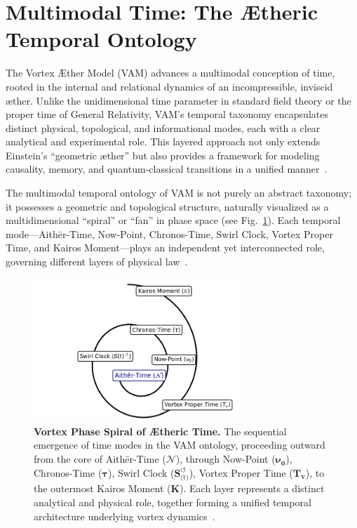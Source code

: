 \documentclass[preprint,notitlepage]{revtex4-2}
\begin{document}
\section{Multimodal Time: The Ætheric Temporal Ontology}

The Vortex Æther Model (VAM) advances a multimodal conception of time, rooted in the internal and relational dynamics of an incompressible, inviscid æther. Unlike the unidimensional time parameter in standard field theory or the proper time of General Relativity, VAM’s temporal taxonomy encapsulates distinct physical, topological, and informational modes, each with a clear analytical and experimental role. This layered approach not only extends Einstein’s “geometric æther” but also provides a framework for modeling causality, memory, and quantum-classical transitions in a unified manner~\cite{VAM-8, VAM-13, VAM-15}.

The multimodal temporal ontology of VAM is not purely an abstract taxonomy; it possesses a geometric and topological structure, naturally visualized as a multidimensional “spiral” or “fan” in phase space (see Fig.~\ref{fig:temporal_ontology}). Each temporal mode—Aithēr-Time, Now-Point, Chronos-Time, Swirl Clock, Vortex Proper Time, and Kairos Moment—plays an independent yet interconnected role, governing different layers of physical law~\cite{VAM-8, VAM-13}.

\begin{figure}[H]
    \centering
    \includegraphics[width=0.7\textwidth]{TemporalOntology}
    \caption{
        \textbf{Vortex Phase Spiral of Ætheric Time.}
        The sequential emergence of time modes in the VAM ontology, proceeding outward from the core of Aithēr-Time ($\boldsymbol{\mathcal{N}}$), through Now-Point ($\boldsymbol{\nu_0}$), Chronos-Time ($\boldsymbol{\tau}$), Swirl Clock ($\boldsymbol{S}^{\boldsymbol{\circlearrowleft}}_\text{(t)}$), Vortex Proper Time ($\boldsymbol{T_v}$), to the outermost Kairos Moment ($\mathbb{\boldsymbol{K}}$). Each layer represents a distinct analytical and physical role, together forming a unified temporal architecture underlying vortex dynamics~\cite{VAM-8, VAM-13}.
    }
    \label{fig:temporal_ontology}
\end{figure}
\end{document}
